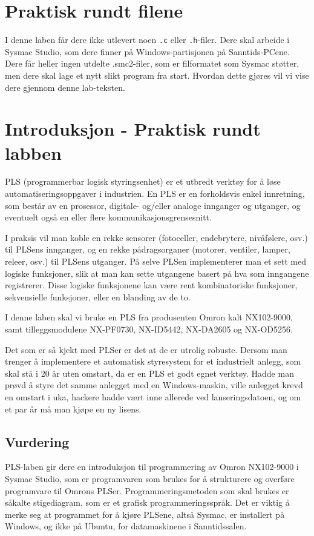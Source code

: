 \begin{alphasection}
\section{Praktisk rundt filene}

I denne laben får dere ikke utlevert noen \verb|.c| eller \verb|.h|-filer. Dere skal arbeide i Sysmac Studio, som dere finner på Windows-partisjonen på Sanntids-PCene. Dere får heller ingen utdelte .smc2-filer, som er filformatet som Sysmac støtter, men dere skal lage et nytt slikt program fra start. Hvordan dette gjøres vil vi vise dere gjennom denne lab-teksten.

\section{Introduksjon - Praktisk rundt labben}


PLS (programmerbar logisk styringsenhet) er et utbredt verktøy for å løse automatiseringsoppgaver i industrien. En PLS er en forholdsvis enkel innretning, som består av en prosessor, digitale- og/eller analoge innganger og utganger, og eventuelt også en eller flere kommunikasjonsgrensesnitt.

I praksis vil man koble en rekke sensorer (fotoceller, endebrytere, nivåfølere, osv.) til PLSens innganger, og en rekke pådragsorganer (motorer, ventiler, lamper, releer, osv.) til PLSens utganger. På selve PLSen implementerer man et sett med logiske funksjoner, slik at man kan sette utgangene basert på hva som inngangene registrerer. Disse logiske funksjonene kan være rent kombinatoriske funksjoner, sekvensielle funksjoner, eller en blanding av de to.

I denne laben skal vi bruke en PLS fra produsenten Omron kalt NX102-9000, samt tilleggsmodulene NX-PF0730, NX-ID5442, NX-DA2605 og NX-OD5256.

Det som er så kjekt med PLSer er det at de er utrolig robuste. Dersom man trenger å implementere et automatisk styresystem for et industrielt anlegg, som skal stå i 20 år uten omstart, da er en PLS et godt egnet verktøy. Hadde man prøvd å styre det samme anlegget med en Windows-maskin, ville anlegget krevd en omstart i uka, hackere hadde vært inne allerede ved lanseringsdatoen, og om et par år må man kjøpe en ny lisens.

\subsection*{Vurdering}
PLS-laben gir dere en introduksjon til programmering av Omron NX102-9000 i Sysmac Studio, som er programvaren som brukes for å strukturere og overføre programvare til Omrons PLSer. Programmeringsmetoden som skal brukes er såkalte stigediagram, som er et grafisk programmeringsspråk. Det er viktig å merke seg at programmet for å kjøre PLSene, altså Sysmac, er installert på Windows, og ikke på Ubuntu, for datamaskinene i Sanntidssalen.\\


\end{alphasection}
